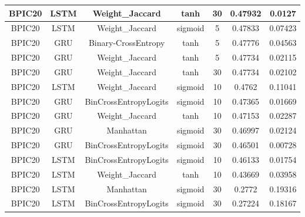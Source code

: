 \documentclass{article}%
\begin{document}
\begin{longtable}{|c|c|c|c|c|c|c|}
\hline%
BPIC20&LSTM&Weight\_Jaccard&tanh&30&0.47932&0.0127\\%
\hline%
BPIC20&LSTM&Weight\_Jaccard&sigmoid&5&0.47833&0.07423\\%
\hline%
BPIC20&GRU&Binary{-}CrossEntropy&tanh&5&0.47776&0.04563\\%
\hline%
BPIC20&GRU&Weight\_Jaccard&tanh&5&0.47734&0.02115\\%
\hline%
BPIC20&GRU&Weight\_Jaccard&tanh&30&0.47734&0.02102\\%
\hline%
BPIC20&LSTM&Weight\_Jaccard&sigmoid&10&0.4762&0.11041\\%
\hline%
BPIC20&GRU&BinCrossEntropyLogits&sigmoid&10&0.47365&0.01669\\%
\hline%
BPIC20&GRU&Weight\_Jaccard&tanh&10&0.47153&0.02287\\%
\hline%
BPIC20&GRU&Manhattan&sigmoid&30&0.46997&0.02124\\%
\hline%
BPIC20&GRU&BinCrossEntropyLogits&sigmoid&30&0.46501&0.00728\\%
\hline%
BPIC20&LSTM&BinCrossEntropyLogits&sigmoid&10&0.46133&0.01754\\%
\hline%
BPIC20&LSTM&Weight\_Jaccard&tanh&10&0.43669&0.03958\\%
\hline%
BPIC20&LSTM&Manhattan&sigmoid&30&0.2772&0.19316\\%
\hline%
BPIC20&LSTM&BinCrossEntropyLogits&sigmoid&30&0.27224&0.18167\\%
\hline%
\end{longtable}

%
\end{document}
